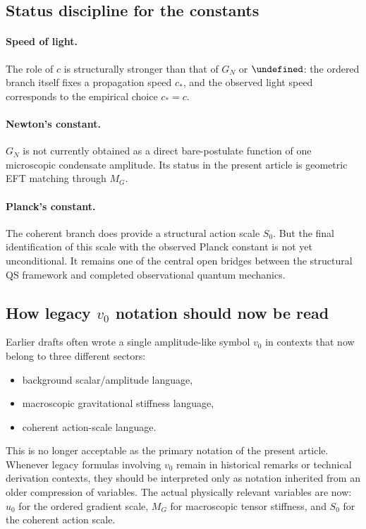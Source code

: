 \documentclass[11pt,a4paper]{article}
\let\hbar\undefined
\numberwithin{equation}{section}
\begin{document}
\subsection*{Status discipline for the constants}

\paragraph{Speed of light.}
The role of $c$ is structurally stronger than that of $G_N$ or $\hbar$:
the ordered branch itself fixes a propagation speed $c_*$, and the
observed light speed corresponds to the empirical choice $c_*=c$.

\paragraph{Newton's constant.}
$G_N$ is not currently obtained as a direct bare-postulate function of
one microscopic condensate amplitude.
Its status in the present article is geometric EFT matching through
$M_G$.

\paragraph{Planck's constant.}
The coherent branch does provide a structural action scale $S_0$.
But the final identification of this scale with the observed Planck
constant is not yet unconditional.
It remains one of the central open bridges between the structural QS
framework and completed observational quantum mechanics.

\subsection*{How legacy $v_0$ notation should now be read}

Earlier drafts often wrote a single amplitude-like symbol $v_0$ in
contexts that now belong to three different sectors:
\begin{itemize}
  \item background scalar/amplitude language,
  \item macroscopic gravitational stiffness language,
  \item coherent action-scale language.
\end{itemize}
This is no longer acceptable as the primary notation of the present
article.
Whenever legacy formulas involving $v_0$ remain in historical remarks or
technical derivation contexts, they should be interpreted only as
notation inherited from an older compression of variables.
The actual physically relevant variables are now:
$u_0$ for the ordered gradient scale,
$M_G$ for macroscopic tensor stiffness,
and $S_0$ for the coherent action scale.
\end{document}
